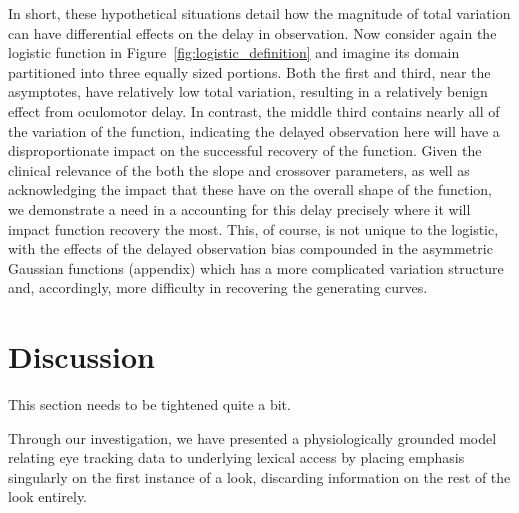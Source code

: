 \documentclass{article}
\begin{document}
In short, these hypothetical situations detail how the magnitude of total variation can have differential effects on the delay in observation. Now consider again the logistic function in Figure~\ref{fig:logistic_definition} and imagine its domain partitioned into three equally sized portions. Both the first and third, near the asymptotes, have relatively low total variation, resulting in a relatively benign effect from oculomotor delay. In contrast, the middle third contains nearly all of the variation of the function, indicating the delayed observation here will have a disproportionate impact on the successful recovery of the function. Given the clinical relevance of the both the slope and crossover parameters, as well as acknowledging the impact that these have on the overall shape of the function, we demonstrate a need in a accounting for this delay precisely where it will impact function recovery the most. This, of course, is not unique to the logistic, with the effects of the delayed observation bias compounded in the asymmetric Gaussian functions (appendix) which has a more complicated variation structure and, accordingly, more difficulty in recovering the generating curves.


\section{Discussion}

This section needs to be tightened quite a bit.

Through our investigation, we have presented a physiologically grounded model relating eye tracking data to underlying lexical access by placing emphasis singularly on the first instance of a look, discarding information on the rest of the look entirely. 
\end{document}
